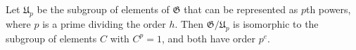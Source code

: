 Let $\mathfrak{U}_p$ be the subgroup of elements of $\mathfrak{G}$ that can be represented as $p$th powers, where $p$ is a prime dividing the order $h$. Then $\mathfrak{G}/\mathfrak{U}_p$ is isomorphic to the subgroup of elements $C$ with $C^p = 1$, and both have order $p^e$.
